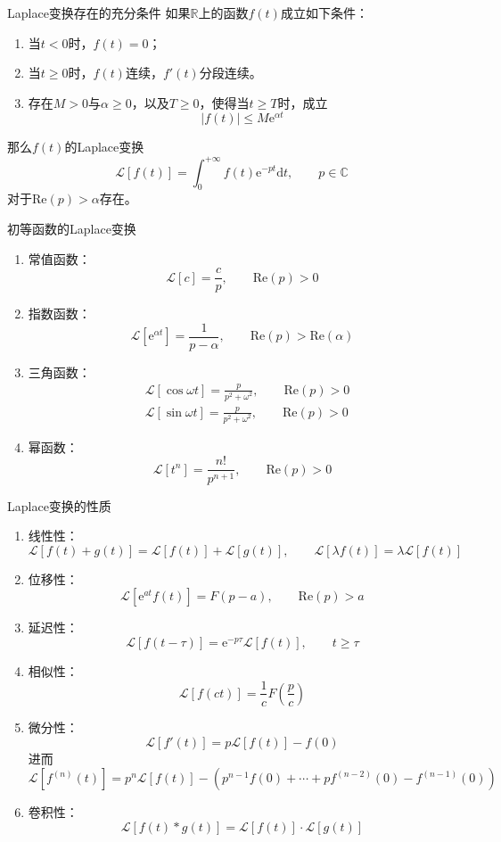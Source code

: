 \documentclass[lang = cn, scheme = chinese, thmcnt = section]{elegantbook}
\newcommand{\R}{\mathbb{R}}            %
\newcommand{\C}{\mathbb{C}}  		   %
\newcommand{\dd}{\mathrm{d}}           %
\newcommand{\ee}[1]{\mathrm{e}^{#1}}   %
\begin{document}
\begin{theorem}{Laplace变换存在的充分条件}
	如果$\R$上的函数$f(t)$成立如下条件：
	\begin{enumerate}
		\item 当$t<0$时，$f(t)=0$；
		\item 当$t\ge 0$时，$f(t)$连续，$f'(t)$分段连续。
		\item 存在$M>0$与$\alpha\ge 0$，以及$T\ge 0$，使得当$t\ge T$时，成立%
		$$
		|f(t)|\le M\ee{\alpha t}
		$$
	\end{enumerate}
	那么$f(t)$的Laplace变换
	$$
	\mathscr{L}[f(t)]=\int_{0}^{+\infty}f(t)\ee{-pt}\dd t,\qquad p\in\C
	$$
	对于$\text{Re}(p)>\alpha$存在。
\end{theorem}

\begin{theorem}{初等函数的Laplace变换}
	\begin{enumerate}
		\item 常值函数：%
		$$
		\mathscr{L}[c]=\frac{c}{p},\qquad \text{Re}(p)>0
		$$
		\item 指数函数：%
		$$
		\mathscr{L}[\ee{\alpha t}]=\frac{1}{p-\alpha},\qquad \text{Re}(p)>\text{Re}(\alpha)
		$$
		\item 三角函数：
		\begin{align*}
			& \mathscr{L}[\cos\omega t]=\frac{p}{p^2+\omega^2},\qquad \text{Re}(p)>0\\
			& \mathscr{L}[\sin\omega t]=\frac{p}{p^2+\omega^2},\qquad \text{Re}(p)>0
		\end{align*}
		\item 幂函数：%
		$$
		\mathscr{L}[t^n]=\frac{n!}{p^{n+1}},\qquad \text{Re}(p)>0
		$$
	\end{enumerate}
\end{theorem}

\begin{theorem}{Laplace变换的性质}
	\begin{enumerate}
		\item 线性性：%
		$$
		\mathscr{L}[f(t)+g(t)]=\mathscr{L}[f(t)]+\mathscr{L}[g(t)],\qquad 
		\mathscr{L}[\lambda f(t)]=\lambda \mathscr{L}[f(t)]
		$$
		\item 位移性：%
		$$
		\mathscr{L}[\ee{at}f(t)]=F(p-a),\qquad \text{Re}(p)>a
		$$
		\item 延迟性：%
		$$
		\mathscr{L}[f(t-\tau)]=\ee{-p\tau}\mathscr{L}[f(t)],\qquad t\ge \tau
		$$
		\item 相似性：%
		$$
		\mathscr{L}[f(ct)]=\frac{1}{c}F\left(\frac{p}{c}\right)
		$$
		\item 微分性：%
		$$
		\mathscr{L}[f'(t)]=p\mathscr{L}[f(t)]-f(0)
		$$
		进而%
		$$
		\mathscr{L}[f^{(n)}(t)]
		=p^n\mathscr{L}[f(t)]-(p^{n-1}f(0)+\cdots+pf^{(n-2)}(0)-f^{(n-1)}(0))
		$$
		\item 卷积性：%
		$$
		\mathscr{L}[f(t)*g(t)]=\mathscr{L}[f(t)]\cdot\mathscr{L}[g(t)]
		$$
	\end{enumerate}
\end{theorem}
\end{document}
